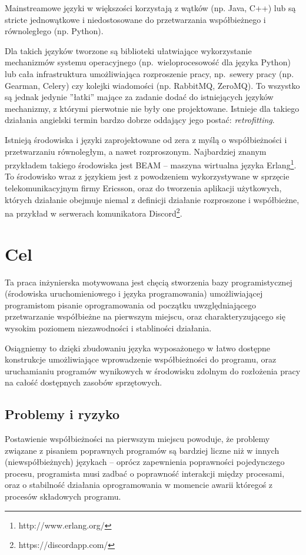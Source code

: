 \documentclass[11pt,oneside,a4paper,titlepage,onecolumn]{book}
\begin{document}
Mainstreamowe języki w większości korzystają z wątków (np. Java, C++) lub są stricte jednowątkowe i
niedostosowane do przetwarzania współbieżnego i równoległego (np. Python).

Dla takich języków tworzone są biblioteki ułatwiające wykorzystanie mechanizmów systemu operacyjnego
(np.~wieloprocesowość dla języka Python) lub cała infrastruktura umożliwiająca rozproszenie pracy,
np.~sewery pracy (np. Gearman, Celery) czy kolejki wiadomości (np. RabbitMQ, ZeroMQ).
To wszystko są jednak jedynie ''łatki'' mające za zadanie dodać do istniejących języków mechanizmy, z którymi
pierwotnie nie były one projektowane. Istnieje dla takiego działania angielski termin bardzo dobrze oddający
jego postać: \emph{retrofitting}.

Istnieją środowiska i języki zaprojektowane od zera z myślą o współbieżności i przetwarzaniu równoległym, a
nawet rozproszonym.
Najbardziej znanym przykładem takiego środowiska jest BEAM -- maszyna wirtualna
języka Erlang\footnote{http://www.erlang.org/}. To środowisko wraz z językiem jest z powodzeniem
wykorzystywane w sprzęcie telekomunikacyjnym firmy Ericsson, oraz do tworzenia aplikacji użytkowych, których
działanie obejmuje niemal z definicji działanie rozproszone i współbieżne, na przykład w serwerach
komunikatora Discord\footnote{https://discordapp.com/}.

\section{Cel}

Ta praca inżynierska motywowana jest chęcią stworzenia bazy programistycznej (środowiska uruchomieniowego i
języka programowania) umożliwiającej programistom pisanie oprogramowania od początku uwzględniającego
przetwarzanie współbieżne na pierwszym miejscu, oraz charakteryzującego się wysokim poziomem niezawodności i
stabliności działania.

Osiągniemy to dzięki zbudowaniu języka wyposażonego w łatwo dostępne konstrukcje umożliwiające wprowadzenie
współbieżności do programu, oraz uruchamianiu programów wynikowych w środowisku zdolnym do rozłożenia pracy na
całość dostępnych zasobów sprzętowych.

\subsection{Problemy i ryzyko}

Postawienie współbieżności na pierwszym miejscu powoduje, że problemy związane z pisaniem poprawnych programów
są bardziej liczne niż w innych (niewspółbieżnych) językach -- oprócz zapewnienia poprawności pojedynczego
procesu, programista musi zadbać o poprawność interakcji między procesami, oraz o stabilność działania
oprogramowania w momencie awarii któregoś z procesów składowych programu.
\end{document}
